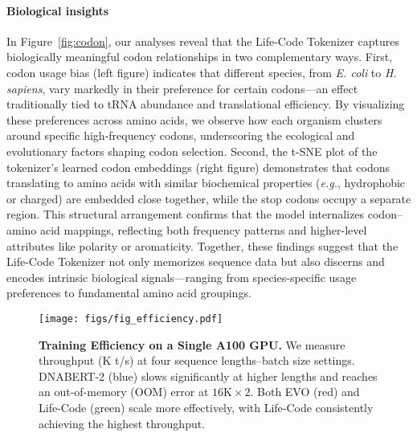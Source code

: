 \paragraph{Biological insights}
In Figure~\ref{fig:codon}, our analyses reveal that the Life-Code Tokenizer captures biologically meaningful codon relationships in two complementary ways. First, codon usage bias (left figure) indicates that different species, from \emph{E. coli} to \emph{H. sapiens}, vary markedly in their preference for certain codons—an effect traditionally tied to tRNA abundance and translational efficiency. By visualizing these preferences across amino acids, we observe how each organism clusters around specific high-frequency codons, underscoring the ecological and evolutionary factors shaping codon selection.
Second, the t-SNE plot of the tokenizer’s learned codon embeddings (right figure) demonstrates that codons translating to amino acids with similar biochemical properties (\textit{e.g.}, hydrophobic or charged) are embedded close together, while the stop codons occupy a separate region. This structural arrangement confirms that the model internalizes codon–amino acid mappings, reflecting both frequency patterns and higher-level attributes like polarity or aromaticity. Together, these findings suggest that the Life-Code Tokenizer not only memorizes sequence data but also discerns and encodes intrinsic biological signals—ranging from species-specific usage preferences to fundamental amino acid groupings.

\begin{figure}[b!]
    \vspace{-1em}
    \centering
    \texttt{[image: figs/fig\_efficiency.pdf]}
    \vspace{-1em}
    \caption{%
    \textbf{Training Efficiency on a Single A100 GPU.}
    We measure throughput (K t/s) at four sequence lengths–batch size settings.
    DNABERT-2 (blue) slows significantly at higher lengths and reaches an out-of-memory (OOM) error at \(16\text{K}\times2\).
    Both EVO (red) and Life-Code (green) scale more effectively, with Life-Code consistently achieving the highest throughput.
    }
    \label{fig:efficiency}
\end{figure}




\vspace{-1em}

